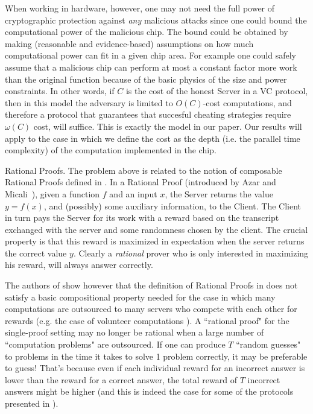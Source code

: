 When working in hardware, however, one may not need the full power of cryptographic protection against {\em any} malicious attacks since one could bound the computational power of the malicious chip. The bound could be obtained by making (reasonable and evidence-based) assumptions on how much computational power can fit in a given chip area. For example one could safely assume that a malicious chip can perform at most a constant factor more work than the original function because of the basic physics of the size and power constraints. In other words, if $C$ is the cost of the honest Server in a VC protocol, then in this model the adversary is limited to $O(C)$-cost computations, and therefore a protocol that guarantees that succesful cheating strategies require $\omega(C)$ cost, will suffice. This is exactly the model in our paper. Our results will apply to the case in which we define the cost as the depth (i.e. the parallel time complexity) of the computation implemented in the chip. 

\medskip
\noindent
{\sc Rational Proofs.}
The problem above is related to the notion of composable Rational Proofs defined in \cite{cg15}. In a Rational Proof (introduced by Azar and Micali~\cite{am,am1}), given a function $f$ and an input $x$, the Server returns the value $y=f(x)$, and (possibly) some auxiliary information, to the Client. The Client in turn 
pays the Server for its work with a reward based on the transcript exchanged with the server and some randomness chosen by the client.  The crucial 
property is that this reward is maximized in expectation when the server 
returns the correct value $y$. Clearly a {\em rational} prover who is only interested 
in maximizing his reward, will always answer correctly. 

The authors of \cite{cg15} 
show however that the definition of Rational Proofs in \cite{am,am1} does not satisfy a basic compositional property needed for the case in which many computations are outsourced to many servers who compete with each other for rewards (e.g. the case of volunteer computations \cite{seti}). 
A ``rational proof" for the single-proof setting may no longer be rational when a large number of ``computation problems" are outsourced. %
If one can produce $T$ ``random guesses" to problems in the time it takes to solve 1 problem correctly,  it may be preferable to guess! That's because even if each individual reward for an incorrect answer is lower than the reward for a correct answer, the total reward of $T$ incorrect answers might be higher (and this is indeed the case for some of the protocols presented in \cite{am,am1}). 

